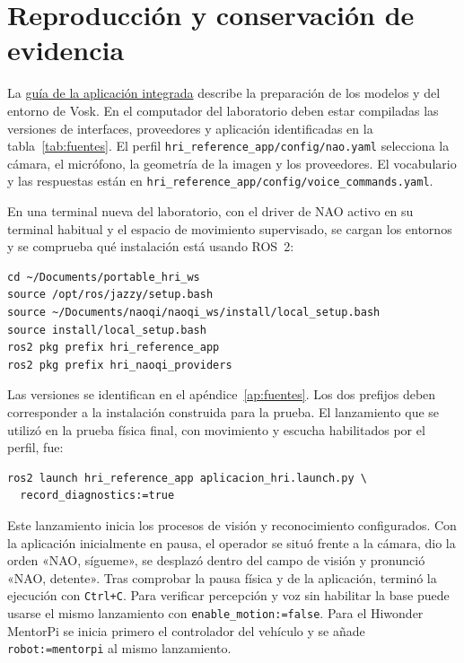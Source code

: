 \documentclass[11pt,letterpaper]{article}
\newcommand{\code}[1]{\nolinkurl{#1}}
\begin{document}
\section{Reproducción y conservación de evidencia}\label{ap:repro}
La \href{https://github.com/jumafe1/portable-hri-reference-system/blob/910c05faed6aa0c4b02872cb7f4f65ebf25ce669/APLICACION_HRI.md}{guía de la aplicación integrada} describe la preparación de los modelos y del entorno de Vosk. En el computador del laboratorio deben estar compiladas las versiones de interfaces, proveedores y aplicación identificadas en la tabla~\ref{tab:fuentes}. El perfil \code{hri_reference_app/config/nao.yaml} selecciona la cámara, el micrófono, la geometría de la imagen y los proveedores. El vocabulario y las respuestas están en \code{hri_reference_app/config/voice_commands.yaml}.

En una terminal nueva del laboratorio, con el driver de NAO activo en su terminal habitual y el espacio de movimiento supervisado, se cargan los entornos y se comprueba qué instalación está usando ROS~2:

\begin{verbatim}
cd ~/Documents/portable_hri_ws
source /opt/ros/jazzy/setup.bash
source ~/Documents/naoqi/naoqi_ws/install/local_setup.bash
source install/local_setup.bash
ros2 pkg prefix hri_reference_app
ros2 pkg prefix hri_naoqi_providers
\end{verbatim}

\noindent\begin{minipage}{\linewidth}
Las versiones se identifican en el apéndice~\ref{ap:fuentes}. Los dos prefijos deben corresponder a la instalación construida para la prueba. El lanzamiento que se utilizó en la prueba física final, con movimiento y escucha habilitados por el perfil, fue:

\begin{verbatim}
ros2 launch hri_reference_app aplicacion_hri.launch.py \
  record_diagnostics:=true
\end{verbatim}
\end{minipage}

Este lanzamiento inicia los procesos de visión y reconocimiento configurados. Con la aplicación inicialmente en pausa, el operador se situó frente a la cámara, dio la orden «NAO, sígueme», se desplazó dentro del campo de visión y pronunció «NAO, detente». Tras comprobar la pausa física y de la aplicación, terminó la ejecución con \code{Ctrl+C}. Para verificar percepción y voz sin habilitar la base puede usarse el mismo lanzamiento con \code{enable_motion:=false}. Para el Hiwonder MentorPi se inicia primero el controlador del vehículo y se añade \code{robot:=mentorpi} al mismo lanzamiento.
\end{document}
